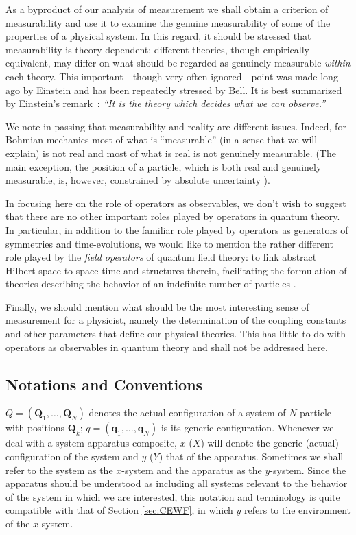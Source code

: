 \documentclass[12pt]{article}
\newcommand{\BM}{Bohmian mechanics}
\newcommand{\rvect}[2]{(#1_1,\ldots,#1_#2)}
\begin{document}
As a byproduct of our analysis of measurement we shall obtain a
criterion of measurability and use it to examine the genuine
measurability of some of the properties of a physical system. In this
regard, it should be stressed that measurability is theory-dependent:
different theories, though empirically equivalent, may differ on what
should be regarded as genuinely measurable \emph{within} each theory.
This important---though very often ignored---point was made long ago
by Einstein and has been repeatedly stressed by Bell.  It is best
summarized by Einstein's remark~\cite{Hei58}: \emph{``It is the theory
   which decides what we can observe.''}

We note in passing that measurability and reality are different
issues.  Indeed, for \BM{} most of what is ``measurable'' (in a sense
that we will explain) is not real and most of what is real is not
genuinely measurable. (The main exception, the position of a particle,
which is both real and genuinely measurable, is, however, constrained
by absolute uncertainty \cite{DGZ92a}).

In focusing here on the role of operators as observables, we don't
wish to suggest that there are no other important roles played by
operators in quantum theory.  In particular, in addition to the
familiar role played by operators as generators of symmetries and
time-evolutions, we would like to mention the rather different role
played by the {\em field operators} of quantum field theory: to link
abstract Hilbert-space to space-time and structures therein,
facilitating the formulation of theories describing the behavior of an
indefinite number of particles \cite{crea1,crea2}.

Finally, we should mention what should be the most interesting sense
of measurement for a physicist, namely the determination of the
coupling constants and other parameters that define our physical
theories. This has little to do with operators as observables in
quantum theory and shall not be addressed here.


\subsection*{Notations and Conventions}
$Q= \rvect{\mathbf{Q}}{N}$ denotes the actual configuration of a
system of $N$ particle with positions $\mathbf{Q}_k$;
$q=\rvect{\mathbf{q}}{N}$ is its generic configuration. Whenever we
deal with a system-apparatus composite, $x$ ($X$) will denote the
generic (actual) configuration of the system and $y$ ($Y$) that of the
apparatus. Sometimes we shall refer to the system as the $x$-system
and the apparatus as the $y$-system.  Since the apparatus should be
understood as including all systems relevant to the behavior of the
system in which we are interested, this notation and terminology is
quite compatible with that of Section \ref{sec:CEWF}, in which $y$
refers to the environment of the $x$-system.
\end{document}
